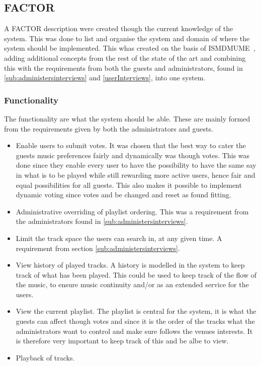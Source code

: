 \subsection{FACTOR}
A FACTOR description were created though the current knowledge of the system. This was done to list and organise the system and domain of where the system should be implemented.
This whas created on the basis of ISMDMUME~\cite{soerensen2004}, adding additional concepts from the rest of the state of the art and combining this with the requirements from both the guests and administrators, found in \cref{sub:administersinterviews} and \cref{userInterviews}, into one system. 
\subsubsection{Functionality}
The functionality are what the system should be able. These are mainly formed from the requirements given by both the administrators and guests.
\begin{itemize}
    \item Enable users to submit votes. It was chosen that the best way to cater the guests music preferences fairly and dynamically was though votes. This was done since they enable every user to have the possibility to have the same say in what is to be played while still rewarding more active users, hence fair and equal possibilities for all guests. This also makes it possible to implement dynamic voting since votes and be changed and reset as found fitting.
    \item Administrative overriding of playlist ordering. This was a requirement from the administrators found in \cref{sub:administersinterviews}.
    \item Limit the track space the users can search in, at any given time. A requirement from section \cref{sub:administersinterviews}.
    \item View history of played tracks. A history is modelled in the system to keep track of what has been played. This could be used to keep track of the flow of the music, to ensure music continuity and/or as an extended service for the users.
		\item View the current playlist. The playlist is central for the system, it is what the guests can affect though votes and since it is the order of the tracks what the administrators want to control and make sure follows the venues interests. It is therefore very important to keep track of this and be albe to view.
    \item Playback of tracks.
\end{itemize}


